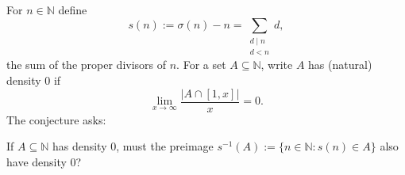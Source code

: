 For $n\in\mathbb{N}$ define
\[
 s(n):=\sigma(n)-n=\sum_{\substack{d\mid n\\ d<n}} d,
\]
the sum of the proper divisors of $n$.
For a set $A\subseteq\mathbb{N}$, write $A$ has (natural) density $0$ if
\[
\lim_{x\to\infty} \frac{|A\cap [1,x]|}{x}=0.
\]
The conjecture asks:

If $A\subseteq\mathbb{N}$ has density $0$, must the preimage
$s^{-1}(A):=\{n\in\mathbb{N}: s(n)\in A\}$ also have density $0$?
